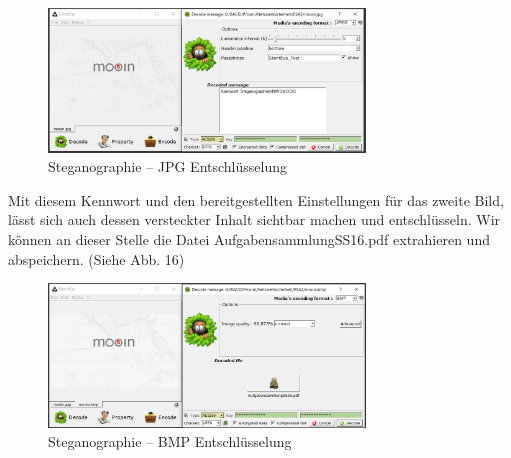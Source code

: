\documentclass{article}
\begin{document}
\begin{figure}[H]
	\includegraphics[width=0.75\textwidth]{images/15}
	\centering
	\caption{Steganographie – JPG Entschlüsselung}
\end{figure}

Mit diesem Kennwort und den bereitgestellten Einstellungen für das zweite Bild, lässt 
sich auch dessen versteckter Inhalt sichtbar machen und entschlüsseln. Wir können an 
dieser Stelle die Datei AufgabensammlungSS16.pdf extrahieren und abspeichern. (Siehe 
Abb. 16)

\begin{figure}[H]
	\includegraphics[width=0.75\textwidth]{images/16}
	\centering
	\caption{Steganographie – BMP Entschlüsselung}
\end{figure}
\end{document}

